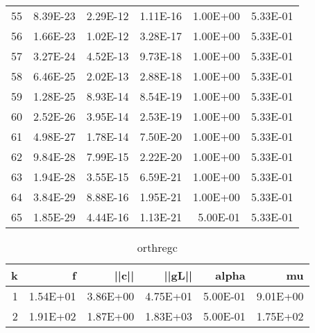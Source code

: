 \documentclass[12pt]{article}
\begin{document}
\begin{table}[htbp]
\begin{tabular}{rrrrrr}
    55    & 8.39E-23 & 2.29E-12 & 1.11E-16 & 1.00E+00 & 5.33E-01 \\
    56    & 1.66E-23 & 1.02E-12 & 3.28E-17 & 1.00E+00 & 5.33E-01 \\
    57    & 3.27E-24 & 4.52E-13 & 9.73E-18 & 1.00E+00 & 5.33E-01 \\
    58    & 6.46E-25 & 2.02E-13 & 2.88E-18 & 1.00E+00 & 5.33E-01 \\
    59    & 1.28E-25 & 8.93E-14 & 8.54E-19 & 1.00E+00 & 5.33E-01 \\
    60    & 2.52E-26 & 3.95E-14 & 2.53E-19 & 1.00E+00 & 5.33E-01 \\
    61    & 4.98E-27 & 1.78E-14 & 7.50E-20 & 1.00E+00 & 5.33E-01 \\
    62    & 9.84E-28 & 7.99E-15 & 2.22E-20 & 1.00E+00 & 5.33E-01 \\
    63    & 1.94E-28 & 3.55E-15 & 6.59E-21 & 1.00E+00 & 5.33E-01 \\
    64    & 3.84E-29 & 8.88E-16 & 1.95E-21 & 1.00E+00 & 5.33E-01 \\
    65    & 1.85E-29 & 4.44E-16 & 1.13E-21 & 5.00E-01 & 5.33E-01 \\
    \bottomrule
    \end{tabular}%
  \label{tab:addlabel}%
\end{table}%


\pagebreak
\begin{table}[htbp]
  \centering
  \caption{orthregc}
    \begin{tabular}{rrrrrr}
    \toprule
    k     & f     & ||c|| & ||gL||   & alpha & mu \\
    \midrule
    1     & 1.54E+01 & 3.86E+00 & 4.75E+01 & 5.00E-01 & 9.01E+00 \\
    2     & 1.91E+02 & 1.87E+00 & 1.83E+03 & 5.00E-01 & 1.75E+02 \\
    \bottomrule
    \end{tabular}%
  \label{tab:addlabel}%
\end{table}%
\end{document}
